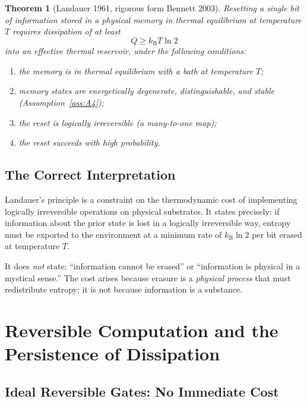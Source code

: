 \documentclass[12pt,letterpaper]{article}
\theoremstyle{plain}
\newtheorem{theorem}{Theorem}[section]
\theoremstyle{definition}
\theoremstyle{remark}
\newcommand{\kB}{k_{\mathrm{B}}}
\newcommand{\lnTwo}{\ln 2}
\begin{document}
\begin{theorem}[Landauer 1961, rigorous form Bennett 2003]\label{thm:landauer}
Resetting a single bit of information stored in a physical memory in thermal equilibrium at
temperature $T$ requires dissipation of at least
\begin{equation}
  Q \geq \kB T \lnTwo
  \label{eq:landauer-bound}
\end{equation}
into an effective thermal reservoir, under the following conditions:
\begin{enumerate}[label=(\roman*)]
  \item the memory is in thermal equilibrium with a bath at temperature $T$;
  \item memory states are energetically degenerate, distinguishable, and stable
        (Assumption~\ref{ass:A4});
  \item the reset is logically irreversible (a many-to-one map);
  \item the reset succeeds with high probability.
\end{enumerate}
\end{theorem}

\subsection{The Correct Interpretation}

Landauer's principle is a constraint on the thermodynamic cost of implementing logically
irreversible operations on physical substrates.  It states precisely: if information about the
prior state is lost in a logically irreversible way, entropy must be exported to the environment
at a minimum rate of $\kB\lnTwo$ per bit erased at temperature $T$.

It does \emph{not} state: ``information cannot be erased'' or ``information is physical in a
mystical sense.'' The cost arises because erasure is a \emph{physical process} that must
redistribute entropy; it is not because information is a substance.

\section{Reversible Computation and the Persistence of Dissipation}
\label{sec:reversible}

\subsection{Ideal Reversible Gates: No Immediate Cost}
\end{document}
